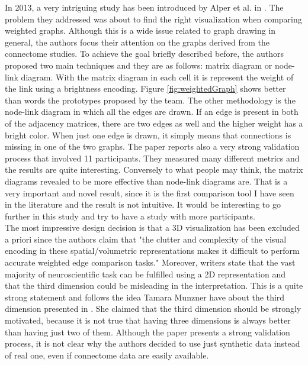 \documentclass{article}
\begin{document}
\begin{multicols}{2}
In 2013, a very intriguing study has been introduced by Alper et al. in \cite{weightedGraphComparison}. The problem they addressed was about to find the right visualization when comparing weighted graphs. Although this is a wide issue related to graph drawing in general, the authors focus their attention on the graphs derived from the connectome studies. To achieve the goal briefly described before, the authors proposed two main techniques and they are as follows: matrix diagram or node-link diagram. With the matrix diagram in each cell it is represent the weight of the link using a brightness encoding. Figure \ref{fig:weightedGraph} shows better than words the prototypes proposed by the team. The other methodology is the node-link diagram in which all the edges are drawn. If an edge is present in both of the adjacency matrices, there are two edges as well and the higher weight has a bright color. When just one edge is drawn, it simply means that connections is missing in one of the two graphs.
The paper reports also a very strong validation process that involved 11 participants. They measured many different metrics and the results are quite interesting. Conversely to what people may think, the matrix diagrams revealed to be more effective than node-link diagrams are. That is a very important and novel result, since it is the first comparison tool I have seen in the literature and the result is not intuitive. It would be interesting to go further in this study and try to have a study with more participants.\\
The most impressive design decision is that a 3D visualization has been excluded a priori since the authors claim that "the clutter and complexity of the visual encoding in these spatial/volumetric representations makes it difficult to perform accurate weighted edge comparison tasks." Moreover, writers state that the vast majority of neuroscientific task can be fulfilled using a 2D representation and that the third dimension could be misleading in the interpretation. This is a quite strong statement and follows the idea Tamara Munzner have about the third dimension presented in \cite{processAndPitfalls}. She claimed that the third dimension should be strongly motivated, because it is not true that having three dimensions is always better than having just two of them. Although the paper presents a strong validation process, it is not clear why the authors decided to use just synthetic data instead of real one, even if connectome data are easily available.


\end{multicols}
\end{document}
